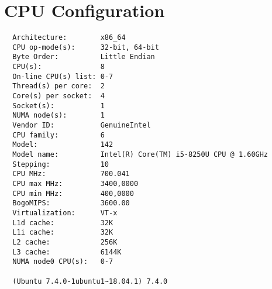 \section{CPU Configuration}
\begin{verbatim}
  Architecture:        x86_64
  CPU op-mode(s):      32-bit, 64-bit
  Byte Order:          Little Endian
  CPU(s):              8
  On-line CPU(s) list: 0-7
  Thread(s) per core:  2
  Core(s) per socket:  4
  Socket(s):           1
  NUMA node(s):        1
  Vendor ID:           GenuineIntel
  CPU family:          6
  Model:               142
  Model name:          Intel(R) Core(TM) i5-8250U CPU @ 1.60GHz
  Stepping:            10
  CPU MHz:             700.041
  CPU max MHz:         3400,0000
  CPU min MHz:         400,0000
  BogoMIPS:            3600.00
  Virtualization:      VT-x
  L1d cache:           32K
  L1i cache:           32K
  L2 cache:            256K
  L3 cache:            6144K
  NUMA node0 CPU(s):   0-7

  (Ubuntu 7.4.0-1ubuntu1~18.04.1) 7.4.0

\end{verbatim}
